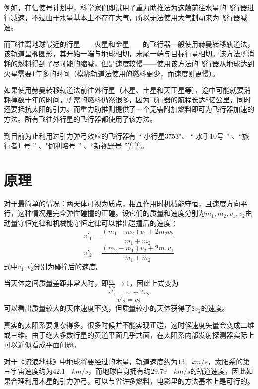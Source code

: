 \documentclass[UTF8,a4paper,10pt]{ctexart}
\begin{document}
\begin{multicols}{2}
    例如，在信使号计划中，科学家们即试用了重力助推法为这艘前往水星的飞行器进行减速，不过由于水星基本上不存在大气，所以无法使用大气制动来为飞行器减速。\par
    而飞往离地球最近的行星——火星和金星——的飞行器一般使用赫曼转移轨道法，该轨道呈椭圆形，其开始一端与地球相切，末尾一端与目标行星相切。该方法所消耗的燃料得到了尽可能的缩减，但是速度较慢——使用该方法的飞行器从地球达到火星需要1年多的时间（模糊轨道法使用的燃料更少，而速度则更慢）。\par
    如果使用赫曼转移轨道法前往外行星（木星、土星和天王星等），途中可能就要消耗掉数十年的时间，所需的燃料仍然很多，因为飞行器的航程长达8亿公里，同时还要抵抗太阳的引力。而重力助推则提供了一个无需附加燃料即可为飞行器加速的方法。所有飞往外行星的飞行器都使用了该方法。\par
    到目前为止利用过引力弹弓效应的飞行器有 “ 小行星3753"、 “ 水手10号 ” 、“旅行者1 号 ” 、"伽利略号 ” 、“新视野号 ”等等。\cite{wiki}\par
\section{原理}
    对于最简单的情况：两天体可视为质点，相互作用时机械能守恒，且速度方向平行，这种情况是完全弹性碰撞的正碰。设它们的质量和速度分别为$m_1,m_2,v_1,v_2$由动量守恒定律和机械能守恒定律可以推出碰撞后的速度：
    \begin{equation}
        v'_1 = \frac{(m_1-m_2)v_1 + 2m_2v_2}{m_1+m_2}
    \end{equation}
    \begin{equation}
        v'_2 = \frac{(m_2-m_1)v_2 + 2m_1v_1}{m_1+m_2}
    \end{equation}
    式中$v_1^{'},v_2^{'}$分别为碰撞后的速度。\par
    当天体之间质量差距非常大时，即$\frac{m_1}{m_2} \to 0$，因此上式变为
    \begin{equation}
        v'_1 = v_1 + 2v_2
    \end{equation}
    \begin{equation}
        v'_2 = v_2
    \end{equation}
    可以看出质量较大的天体速度不变，但质量较小的天体获得了$2v_2$的速度。\par
    真实的太阳系要复杂得多，很多时候并不能实现正碰，这时候速度矢量会变成二维或三维。由于绝大多数行星的黄道平面几乎共面，在太阳系内部发射探测器实际上可以近似看成平面问题。\par
    对于《流浪地球》中地球将要经过的木星，轨道速度约为$13\quad km/s$，太阳系的第三宇宙速度约为$42.1\quad km/s$，而地球自身拥有约$29.79\quad km/s$的轨道速度，因此如果合理利用木星的引力弹弓，可以节省许多燃料，电影里的方法基本上是可行的。
\end{multicols}


\end{document}
